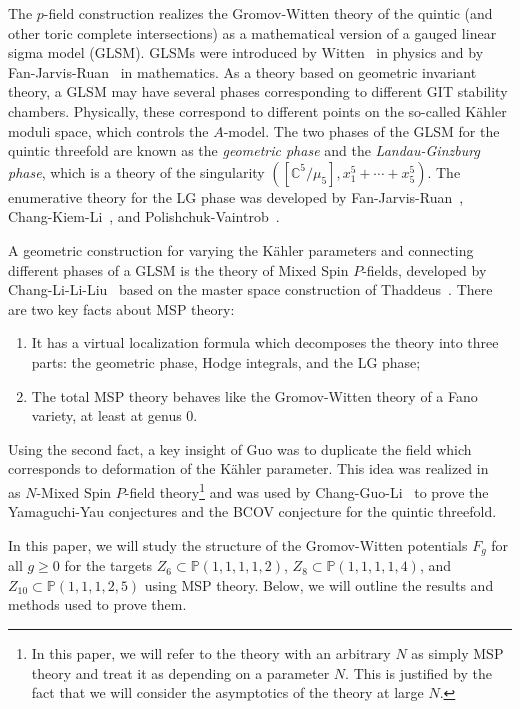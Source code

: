 \documentclass[10pt]{amsart}
\theoremstyle{definition}
\theoremstyle{remark}
\theoremstyle{plain}
\theoremstyle{definition}
\theoremstyle{remark}
\newcommand{\C}{\mathbb{C}}
\renewcommand{\P}{\mathbb{P}}
\newcommand{\1}{\mathbf{1}}
\newcommand{\2}{\mathbf{2}}
\newcommand{\3}{\mathbf{3}}
\numberwithin{equation}{section}
\begin{document}
The $p$-field construction realizes the Gromov-Witten theory of the quintic (and other toric complete intersections) as a mathematical version of a gauged linear sigma model (GLSM). GLSMs were introduced by Witten~\cite{mirrorandglsm} in physics and by Fan-Jarvis-Ruan~\cite{glsm} in mathematics. As a theory based on geometric invariant theory, a GLSM may have several phases corresponding to different GIT stability chambers. Physically, these correspond to different points on the so-called K\"ahler moduli space, which controls the $A$-model. The two phases of the GLSM for the quintic threefold are known as the \textit{geometric phase} and the \textit{Landau-Ginzburg phase}, which is a theory of the singularity $( [\C^5/\mu_5], x_1^5 + \cdots + x_5^5 )$. The enumerative theory for the LG phase was developed by Fan-Jarvis-Ruan~\cite{fjrw}, Chang-Kiem-Li~\cite{algvcquantumsingularity}, and Polishchuk-Vaintrob~\cite{mfcohftFJRW}.

A geometric construction for varying the K\"ahler parameters and connecting different phases of a GLSM is the theory of Mixed Spin $P$-fields, developed by Chang-Li-Li-Liu~\cite{mspfermat, msp2} based on the master space construction of Thaddeus~\cite{gitflips}. There are two key facts about MSP theory:
\begin{enumerate}
    \item It has a virtual localization formula which decomposes the theory into three parts: the geometric phase, Hodge integrals, and the LG phase;
    \item The total MSP theory behaves like the Gromov-Witten theory of a Fano variety, at least at genus $0$.
\end{enumerate}
Using the second fact, a key insight of Guo was to duplicate the field which corresponds to deformation of the K\"ahler parameter. This idea was realized in~\cite{nmsp} as $N$-Mixed Spin $P$-field theory\footnote{In this paper, we will refer to the theory with an arbitrary $N$ as simply MSP theory and treat it as depending on a parameter $N$. This is justified by the fact that we will consider the asymptotics of the theory at large $N$.} and was used by Chang-Guo-Li~\cite{nmsp2, nmsp3} to prove the Yamaguchi-Yau conjectures and the BCOV conjecture for the quintic threefold. 

In this paper, we will study the structure of the Gromov-Witten potentials $F_g$ for all $g \geq 0$ for the targets $Z_6 \subset \P(1,1,1,1,2)$, $Z_8 \subset \P(1,1,1,1,4)$, and $Z_{10} \subset \P(1,1,1,2,5)$ using MSP theory. Below, we will outline the results and methods used to prove them.
\end{document}
